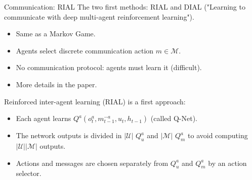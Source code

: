 \documentclass{beamer}
\begin{document}
\begin{frame}{Communication: RIAL}
The two first methods: RIAL and DIAL ("Learning to communicate with deep multi-agent reinforcement learning").

\begin{itemize}
    \item Same as a Markov Game.
    \item Agents select discrete communication action $m \in \mathcal{M}$.
    \item No communication protocol: agents must learn it (difficult).
    \item More details in the paper.
\end{itemize}
\vfill
Reinforced inter-agent learning (RIAL) is a first approach:
\begin{itemize}
    \item Each agent learns $Q^a(o^a_t, m^{-a}_{t-1}, u_t, h_{t-1})$ (called Q-Net).
    \item The network outputs is divided in $|\mathcal{U}|$ $Q^a_u$ and $|\mathcal{M}|$ $Q^a_m$ to avoid computing $|\mathcal{U}||\mathcal{M}|$ outputs.
    \item Actions and messages are chosen separately from $Q^a_u$ and $Q^a_m$ by an action selector.
\end{itemize}
\end{frame}
\end{document}

